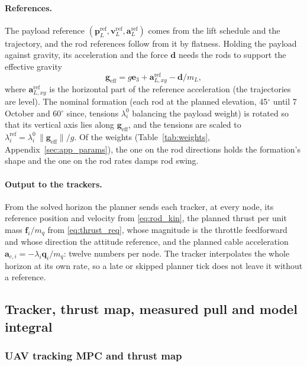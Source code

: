 \paragraph{References.} The payload reference $(\mathbf{p}_L^{\mathrm{ref}}, \mathbf{v}_L^{\mathrm{ref}},
\mathbf{a}_L^{\mathrm{ref}})$ comes from the lift schedule and the trajectory, and the rod references
follow from it by flatness. Holding the payload against gravity, its acceleration and the force
$\mathbf{d}$ needs the rods to support the effective gravity
\begin{equation}
    \mathbf{g}_{\mathrm{eff}} = g\mathbf{e}_3 + \mathbf{a}_{L,xy}^{\mathrm{ref}} - \mathbf{d}/m_L ,
\end{equation}
where $\mathbf{a}_{L,xy}^{\mathrm{ref}}$ is the horizontal part of the reference acceleration (the
trajectories are level). The nominal formation (each rod at the planned elevation, 45$^\circ$ until 7 October and 60$^\circ$ since, tensions
$\lambda_i^{0}$ balancing the payload weight) is rotated so that its vertical axis lies along
$\mathbf{g}_{\mathrm{eff}}$, and the tensions are scaled to $\lambda_i^{\mathrm{ref}} = \lambda_i^{0}\,
\|\mathbf{g}_{\mathrm{eff}}\| / g$. Of the weights (Table~\ref{tab:weights}, Appendix~\ref{sec:app_params}),
the one on the rod directions holds the formation's shape and the one on the rod rates damps rod swing.

\paragraph{Output to the trackers.} From the solved horizon the planner sends each tracker, at every node,
its reference position and velocity from \eqref{eq:rod_kin}, the planned thrust per unit mass
$\mathbf{f}_i/m_q$ from \eqref{eq:thrust_req}, whose magnitude is the throttle feedforward and whose direction
the attitude reference, and the planned cable acceleration $\mathbf{a}_{c,i} = -\lambda_i \mathbf{q}_i / m_q$:
twelve numbers per node. The tracker interpolates the whole horizon at its own rate, so a late or skipped
planner tick does not leave it without a reference.

\subsection{Tracker, thrust map, measured pull and model integral}
\label{sec:tracker}

\subsubsection{UAV tracking MPC and thrust map}

